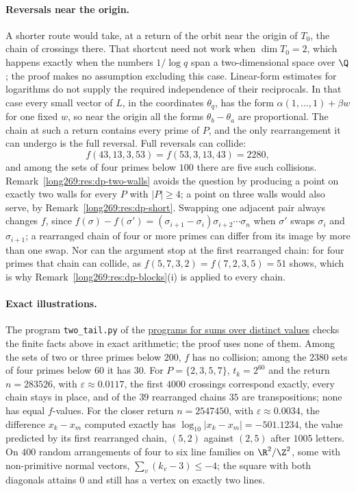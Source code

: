 \paragraph{Reversals near the origin.}  A shorter route would take, at a
return of the orbit near the origin of $T_0$, the chain of crossings there.
That shortcut need not work when $\dim T_0=2$, which happens exactly when the numbers
$1/\log q$ span a two-dimensional space over $\Q$; the proof makes no assumption excluding this case. Linear-form estimates for logarithms do not supply the required independence of their reciprocals.  In that case every small vector of $L$, in the coordinates
$\theta_q$, has the form $\alpha(1,\ldots,1)+\beta w$ for one fixed $w$, so
near the origin all the forms $\theta_b-\theta_a$ are proportional.  The
chain at such a return contains every prime of $P$, and the only
rearrangement it can undergo is the full reversal.  Full reversals can
collide:
\[
 f(43,13,3,53)=f(53,3,13,43)=2280,
\]
and among the sets of four primes below $100$ there are five such
collisions.  Remark~\ref{long269:res:dp-two-walls} avoids the question by
producing a point on exactly two walls for every $P$ with $|P|\ge4$; a point
on three walls would also serve, by Remark~\ref{long269:res:dp-short}.
Swapping one adjacent pair always changes $f$, since
$f(\sigma)-f(\sigma')=(\sigma_{i+1}-\sigma_i)\sigma_{i+2}\cdots\sigma_n$
when $\sigma'$ swaps $\sigma_i$ and $\sigma_{i+1}$; a rearranged chain of
four or more primes can differ from its image by more than one swap.  Nor can the argument stop at
the first rearranged chain: for four primes that chain can collide, as
$f(5,7,3,2)=f(7,2,3,5)=51$ shows, which is why
Remark~\ref{long269:res:dp-blocks}(i) is applied to every chain.

\paragraph{Exact illustrations.}  The program \texttt{two\_tail.py} of the
\href{\distinctheighturl}{programs for sums over distinct values} checks the finite facts
above in exact arithmetic; the proof uses none of them.  Among the sets of
two or three primes below $200$, $f$ has no collision; among the $2380$
sets of four primes below $60$ it has $30$.  For $P=\{2,3,5,7\}$,
$t_k=2^{60}$ and the return $n=283526$, with $\varepsilon\approx0.0117$,
the first $4000$ crossings correspond exactly, every chain stays in place,
and of the $39$ rearranged chains $35$ are transpositions; none has equal
$f$-values.  For the closer return $n=2547450$, with
$\varepsilon\approx0.0034$, the difference $x_k-x_m$ computed exactly has
$\log_{10}|x_k-x_m|=-501.1234$, the value predicted by its first
rearranged chain, $(5,2)$ against $(2,5)$ after $1005$ letters.  On $400$
random arrangements of four to six line families on $\R^2/\Z^2$, some with
non-primitive normal vectors, $\sum_v(k_v-3)\le-4$; the square with both
diagonals attains $0$ and still has a vertex on exactly two lines.

